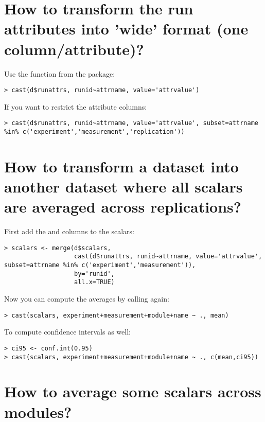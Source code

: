 \section{How to transform the run attributes into 'wide' format (one column/attribute)?}

Use the  function from the  package:

\begin{verbatim}
> cast(d$runattrs, runid~attrname, value='attrvalue')
\end{verbatim}

If you want to restrict the attribute columns:

\begin{verbatim}
> cast(d$runattrs, runid~attrname, value='attrvalue', subset=attrname %in% c('experiment','measurement','replication'))
\end{verbatim}

\section{How to transform a dataset into another dataset where all scalars are averaged across replications?}

First add the  and  columns to the scalars:

\begin{verbatim}
> scalars <- merge(d$scalars,
                   cast(d$runattrs, runid~attrname, value='attrvalue', subset=attrname %in% c('experiment','measurement')),
                   by='runid',
                   all.x=TRUE)
\end{verbatim}

Now you can compute the averages by calling  again:

\begin{verbatim}
> cast(scalars, experiment+measurement+module+name ~ ., mean)
\end{verbatim}

To compute confidence intervals as well:

\begin{verbatim}
> ci95 <- conf.int(0.95)
> cast(scalars, experiment+measurement+module+name ~ ., c(mean,ci95))
\end{verbatim}

\section{How to average some scalars across modules?}

